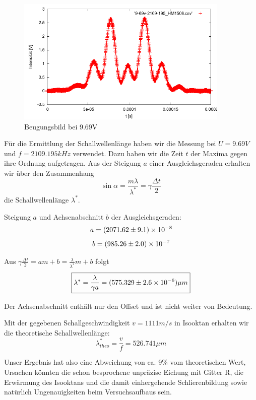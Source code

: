 \begin{figure}[H]
 \includegraphics[width=0.9\textwidth]{Bilder/9-69v.pdf}
 \caption{Beugungsbild bei 9.69V}
\end{figure}

Für die Ermittlung der Schallwellenlänge haben wir die Messung bei $ U = 9.69 V$ und $f = 2109.195 kHz $ verwendet. Dazu haben wir die Zeit $t$ der Maxima gegen ihre Ordnung aufgetragen. Aus der Steigung $a$ einer Ausgleichsgeraden erhalten wir über den Zusammenhang 
$$ \sin \alpha = \frac{m \lambda}{\lambda^{*}} = \gamma \frac{\Delta t}{2} $$
 die Schallwellenlänge $ \lambda^* $.


Steigung $a$ und Achsenabschnitt $b$ der Ausgleichsgeraden:
$$ a = (2071.62 \pm 9.1) \times 10^{-8} $$
$$ b = (985.26 \pm 2.0) \times 10^{-7} $$


Aus $ \gamma \frac{\Delta t}{2} = a m + b = \frac{\lambda}{\lambda^*} m + b $ folgt 
$$\boxed{ \lambda^* = \frac{\lambda}{\gamma a} = (575.329 \pm 2.6\times 10^{-6}) \mu m}$$

Der Achsenabschnitt enthält nur den Offset und ist nicht weiter von Bedeutung.

Mit der gegebenen Schallgeschwindigkeit $v=1111 m/s$ in Isooktan erhalten wir die theoretische Schallwellenlänge:
$$ \lambda^*_{theo} = \frac{v}{f} = 526.741 \mu m$$

Unser Ergebnis hat also eine Abweichung von ca. 9\% vom theoretischen Wert, Ursachen könnten die schon besprochene unpräzise Eichung mit Gitter R, die Erwärmung des Isooktans und die damit einhergehende Schlierenbildung sowie natürlich Ungenauigkeiten beim Versuchsaufbaus sein.